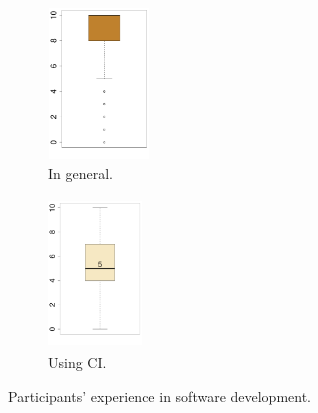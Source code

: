 \begin{figure}[H]
	\centering
	\begin{subfigure}[b]{0.3\textwidth}
		\centering
		\includegraphics[width=2.7cm, height=4.0cm]{developer_experience_in_general.pdf}
		\caption{In general.}
		\label{fig:developers_experience_in_general}
	\end{subfigure} %
	\begin{subfigure}[b]{0.3\textwidth}
		\centering
		\includegraphics[width=2.5cm, height=4.0cm]{developer_experience_using_CI.pdf}  
		\caption{Using CI.}
		\label{fig:developers_experience_using_ci}
	\end{subfigure}
	\caption{Participants' experience in software development.}
	\label{fig:developers_experience}
\end{figure}


